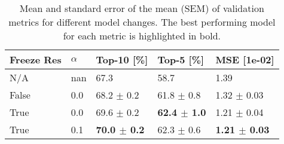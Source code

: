 \begin{table}[h]
\caption{Mean and standard error of the mean (SEM) of validation metrics for different model changes. The best performing model for each metric is highlighted in bold.}
\label{tab:model_changes}
\begin{tabular}{lllll}
\toprule
Freeze Res & $\alpha$ & Top-10 [\%] & Top-5 [\%] & MSE [1e-02] \\
\midrule
N/A & nan & 67.3 & 58.7 & 1.39 \\
False & 0.0 & 68.2 $\pm$ 0.2 & 61.8 $\pm$ 0.8 & 1.32 $\pm$ 0.03 \\
True & 0.0 & 69.6 $\pm$ 0.2 & \textbf{62.4 $\pm$ 1.0} & 1.21 $\pm$ 0.04 \\
True & 0.1 & \textbf{70.0 $\pm$ 0.2} & 62.3 $\pm$ 0.6 & \textbf{1.21 $\pm$ 0.03} \\
\bottomrule
\end{tabular}
\end{table}
